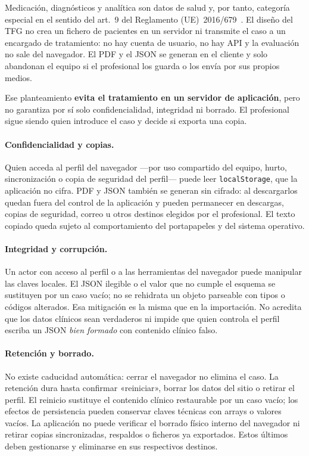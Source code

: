 Medicación, diagnósticos y analítica son datos de salud y, por tanto,
categoría especial en el sentido del art.~9 del Reglamento
(UE)~2016/679~\cite{rgpd2016,aepdsalud}. El diseño del TFG no crea un
fichero de pacientes en un servidor ni transmite el caso a un encargado de
tratamiento: no hay cuenta de usuario, no hay API y la evaluación no sale del
navegador. El PDF y el JSON se generan en el cliente y solo abandonan el
equipo si el profesional los guarda o los envía por sus propios medios.

Ese planteamiento \textbf{evita el tratamiento en un servidor de
aplicación}, pero no garantiza por sí solo confidencialidad, integridad ni
borrado. El profesional sigue siendo quien introduce el caso y decide si
exporta una copia.

\paragraph{Confidencialidad y copias.}
Quien acceda al perfil del navegador ---por uso compartido del equipo,
hurto, sincronización o copia de seguridad del perfil--- puede leer
\texttt{localStorage}, que la aplicación no cifra. PDF y JSON también se
generan sin cifrado: al descargarlos quedan fuera del control de la
aplicación y pueden permanecer en descargas, copias de seguridad, correo u
otros destinos elegidos por el profesional. El texto copiado queda sujeto
al comportamiento del portapapeles y del sistema operativo.

\paragraph{Integridad y corrupción.}
Un actor con acceso al perfil o a las herramientas del navegador puede
manipular las claves locales. El JSON ilegible o el valor que no cumple
el esquema se sustituyen por un caso vacío; no se rehidrata un objeto
parseable con tipos o códigos alterados. Esa mitigación es la misma que
en la importación. No acredita que los datos clínicos sean verdaderos
ni impide que quien controla el perfil escriba un JSON \emph{bien
formado} con contenido clínico falso.

\paragraph{Retención y borrado.}
No existe caducidad automática: cerrar el navegador no elimina el caso. La
retención dura hasta confirmar «reiniciar», borrar los datos del sitio o
retirar el perfil. El reinicio sustituye el contenido clínico restaurable
por un caso vacío; los efectos de persistencia pueden conservar claves
técnicas con arrays o valores vacíos. La aplicación no puede verificar el
borrado físico interno del navegador ni retirar copias sincronizadas,
respaldos o ficheros ya exportados. Estos últimos deben gestionarse y
eliminarse en sus respectivos destinos.

